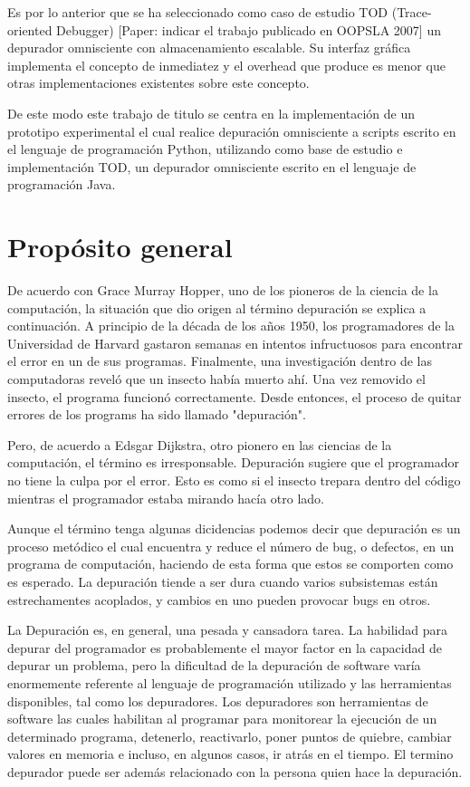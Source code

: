\documentclass[12pt,a4paper]{report}
\begin{document}
Es por lo anterior que se ha seleccionado como caso de estudio TOD (Trace-oriented Debugger) [Paper: indicar el trabajo publicado en OOPSLA 2007] un depurador omnisciente con almacenamiento escalable.  Su interfaz gráfica implementa el concepto de inmediatez y el overhead que produce es menor que otras implementaciones existentes sobre este concepto.

De este modo este trabajo de titulo se centra en la implementación de un prototipo experimental el cual realice depuración omnisciente a scripts escrito en el lenguaje de programación Python, utilizando como base de estudio e implementación TOD, un depurador omnisciente escrito en el lenguaje de programación Java.

\chapter{Propósito general}

De acuerdo con Grace Murray Hopper, uno de los pioneros de la ciencia de la computación, la situación que dio origen al término depuración se explica a continuación. A principio de la década de los años 1950, los programadores de la Universidad de Harvard gastaron semanas en intentos infructuosos para encontrar el error en un de sus programas. Finalmente, una investigación dentro de las computadoras reveló que un insecto había muerto ahí. Una vez removido el insecto, el programa funcionó correctamente. Desde entonces, el proceso de quitar errores de los programs ha sido llamado "depuración".

Pero, de acuerdo a Edsgar Dijkstra, otro pionero en las ciencias de la computación, el término es irresponsable. Depuración sugiere que el programador no tiene la culpa por el error. Esto es como si el insecto trepara dentro del código mientras el programador estaba mirando hacía otro lado.

Aunque el término tenga algunas dicidencias podemos decir que depuración es un proceso metódico el cual encuentra y reduce el número de bug, o defectos, en un programa de computación, haciendo de esta forma que estos se comporten como es esperado.  La depuración tiende a ser dura cuando varios subsistemas están estrechamentes acoplados, y cambios en uno pueden provocar bugs en otros.

La Depuración es, en general, una pesada y cansadora tarea.  La habilidad para depurar del programador es probablemente el mayor factor en la capacidad de depurar un problema, pero la dificultad de la depuración de software varía enormemente referente al lenguaje de programación utilizado y las herramientas disponibles, tal como los depuradores.  Los depuradores son herramientas de software las cuales habilitan al programar para monitorear la ejecución de un determinado programa, detenerlo, reactivarlo, poner puntos de quiebre, cambiar valores en memoria e incluso, en algunos casos, ir atrás en el tiempo.  El termino depurador puede ser además relacionado con la persona quien hace la depuración.
\end{document}
